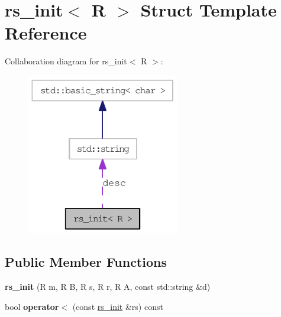 \hypertarget{structrs__init}{
\section{rs\_\-init$<$ R $>$ Struct Template Reference}
\label{structrs__init}
}
Collaboration diagram for rs\_\-init$<$ R $>$:\nopagebreak
\begin{figure}[H]
\begin{center}
\leavevmode
\includegraphics[width=188pt]{structrs__init__coll__graph}
\end{center}
\end{figure}
\subsection*{Public Member Functions}
\begin{DoxyCompactItemize}
\item 
\hypertarget{structrs__init_a93198ddfe0f8ffcfe2ee57df20cd78c5}{
{\bfseries rs\_\-init} (R m, R B, R s, R r, R A, const std::string \&d)}
\label{structrs__init_a93198ddfe0f8ffcfe2ee57df20cd78c5}

\item 
\hypertarget{structrs__init_aaca9f6a2e74df7095086c719d84756b3}{
bool {\bfseries operator$<$} (const \hyperlink{structrs__init}{rs\_\-init} \&rs) const }
\label{structrs__init_aaca9f6a2e74df7095086c719d84756b3}

\end{DoxyCompactItemize}
